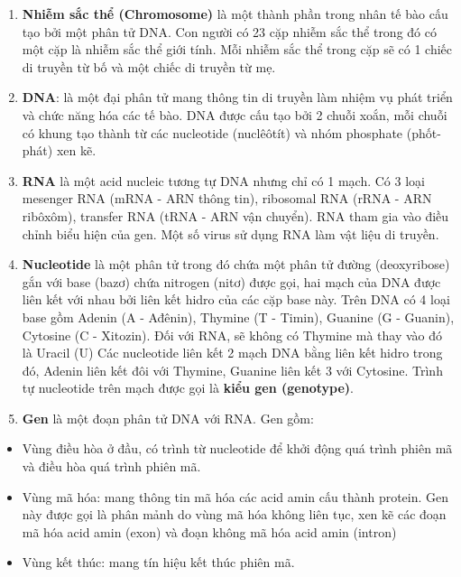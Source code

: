 \documentclass[14pt,oneside]{scrbook}
\providecommand{\tightlist}{\setlength{\itemsep}{\smallskipamount}\setlength{\parskip}{\smallskipamount}}
\begin{document}
\begin{enumerate}
\def\labelenumi{\arabic{enumi})}
\tightlist
\item
  \textbf{Nhiễm sắc thể (Chromosome)} là một thành phần trong nhân tế
  bào cấu tạo bởi một phân tử DNA. Con người có 23 cặp nhiễm sắc thể
  trong đó có một cặp là nhiễm sắc thể giới tính. Mỗi nhiễm sắc thể
  trong cặp sẽ có 1 chiếc di truyền từ bố và một chiếc di truyền từ mẹ.
\item
  \textbf{DNA}: là một đại phân tử mang thông tin di truyền làm nhiệm vụ
  phát triển và chức năng hóa các tế bào. DNA được cấu tạo bởi 2 chuỗi
  xoắn, mỗi chuỗi có khung tạo thành từ các nucleotide (nuclêôtít) và
  nhóm phosphate (phốt-phát) xen kẽ.
\item
  \textbf{RNA} là một acid nucleic tương tự DNA nhưng chỉ có 1 mạch. Có
  3 loại mesenger RNA (mRNA - ARN thông tin), ribosomal RNA (rRNA - ARN
  ribôxôm), transfer RNA (tRNA - ARN vận chuyển). RNA tham gia vào điều
  chỉnh biểu hiện của gen. Một số virus sử dụng RNA làm vật liệu di
  truyền.
\item
  \textbf{Nucleotide} là một phân tử trong đó chứa một phân tử đường
  (deoxyribose) gắn với base (bazơ) chứa nitrogen (nitơ) được gọi, hai
  mạch của DNA được liên kết với nhau bởi liên kết hidro của các cặp
  base này. Trên DNA có 4 loại base gồm Adenin (A - Ađênin), Thymine (T
  - Timin), Guanine (G - Guanin), Cytosine (C - Xitozin). Đối với RNA,
  sẽ không có Thymine mà thay vào đó là Uracil (U) Các nucleotide liên
  kết 2 mạch DNA bằng liên kết hidro trong đó, Adenin liên kết đôi với
  Thymine, Guanine liên kết 3 với Cytosine. Trình tự nucleotide trên
  mạch được gọi là \textbf{kiểu gen (genotype)}.
\item
  \textbf{Gen} là một đoạn phân tử DNA với RNA. Gen gồm:
\end{enumerate}

\begin{itemize}
\tightlist
\item
  Vùng điều hòa ở đầu, có trình từ nucleotide để khởi động quá trình
  phiên mã và điều hòa quá trình phiên mã.
\item
  Vùng mã hóa: mang thông tin mã hóa các acid amin cấu thành protein.
  Gen này được gọi là phân mảnh do vùng mã hóa không liên tục, xen kẽ
  các đoạn mã hóa acid amin (exon) và đoạn không mã hóa acid amin
  (intron)
\item
  Vùng kết thúc: mang tín hiệu kết thúc phiên mã.
\end{itemize}
\end{document}
